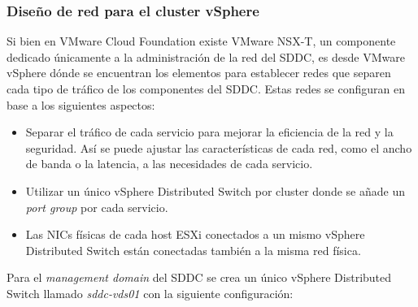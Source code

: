 \subsubsection{Diseño de red para el cluster vSphere}
Si bien en VMware Cloud Foundation existe VMware NSX-T, un componente dedicado únicamente a la administración de la red del SDDC, es desde VMware vSphere dónde se encuentran los elementos para establecer redes que separen cada tipo de tráfico de los componentes del SDDC. Estas redes se configuran en base a los siguientes aspectos:
\begin{itemize}
    \item Separar el tráfico de cada servicio para mejorar la eficiencia de la red y la seguridad. Así se puede ajustar las características de cada red, como el ancho de banda o la latencia, a las necesidades de cada servicio.
    \item Utilizar un único vSphere Distributed Switch por cluster donde se añade un \textit{port group} por cada servicio.
    \item Las NICs físicas de cada host ESXi conectados a un mismo vSphere Distributed Switch están conectadas también a la misma red física.
\end{itemize}
Para el \textit{management domain} del SDDC se crea un único vSphere Distributed Switch llamado \textit{sddc-vds01} con la siguiente configuración:
